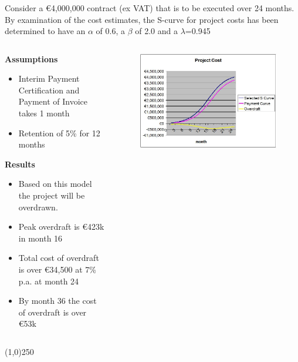 \begin{frame}
\frametitle{}
Consider a \euro4,000,000 contract (ex VAT) that is to be executed over 24 months.  \\
By examination of the cost estimates, the S-curve for project costs has been determined to have an $\alpha$ of 0.6, a $\beta$ of 2.0 and a $\lambda$=0.945\\
\begin{columns}[t]
	\begin{column}[T]{0.7\textwidth}
		
\footnotesize		\textbf{Assumptions}
		\begin{itemize}
			\item Interim Payment Certification and Payment of Invoice takes 1 month
			\item Retention of 5\% for 12 months
		\end{itemize}
		\textbf{Results}
		\begin{itemize}
			\item Based on this model the project will be overdrawn.
			\item Peak overdraft is \euro423k in month 16
			\item Total cost of overdraft is over \euro34,500 at 7\% p.a. at month 24
			\item By month 36 the cost of overdraft is over \euro53k
		\end{itemize}
		
	\end{column}
	\footnotesize
	\begin{column}[T]{0.3\textwidth}
		\begin{figure}
			\centering
				\includegraphics[width=\textwidth]{images/prjcostcurve.jpg}
			\label{fig:prjcostcurve}
		\end{figure}
	\end{column}
\end{columns}
\end{frame}
\begin{center}\line(1,0){250}\end{center}





